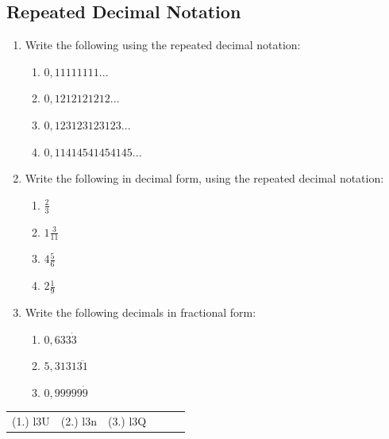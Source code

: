             \subsection{  Repeated Decimal Notation }
            \nopagebreak
      \label{m38348*id64513}\begin{enumerate}[noitemsep, label=\textbf{\arabic*}. ] 
            \label{m38348*uid23}\item Write the following using the repeated decimal notation:
\label{m38348*id64529}\begin{enumerate}[noitemsep, label=\textbf{\alph*}. ] 
            \label{m38348*uid24}\item $0,11111111...$\label{m38348*uid25}\item $0,1212121212...$\label{m38348*uid26}\item $0,123123123123...$\label{m38348*uid27}\item $0,11414541454145...$\end{enumerate}
        \label{m38348*uid28}\item Write the following in decimal form, using the repeated decimal notation:
\label{m38348*id64650}\begin{enumerate}[noitemsep, label=\textbf{\alph*}. ] 
            \label{m38348*uid29}\item $\frac{2}{3}$\label{m38348*uid30}\item $1\frac{3}{11}$\label{m38348*uid31}\item $4\frac{5}{6}$\label{m38348*uid32}\item $2\frac{1}{9}$\end{enumerate}
        \label{m38348*uid33}\item Write the following decimals in fractional form:
\label{m38348*id64767}\begin{enumerate}[noitemsep, label=\textbf{\alph*}. ] 
            \label{m38348*uid34}\item $0,633\dot{3}$\label{m38348*uid35}\item $5,3131\overline{31}$\label{m38348*uid36}\item $0,99999\dot{9}$\end{enumerate}
        \end{enumerate}
\practiceinfo
\par 
 \par \begin{tabular}[h]{cccccc}
 (1.) l3U  &  (2.) l3n  &  (3.) l3Q  & \end{tabular}

